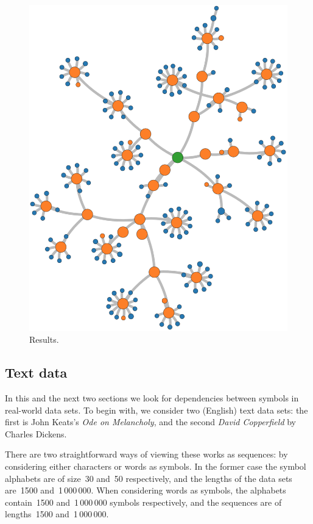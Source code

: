 \documentclass[12pt,a4paper]{article}
\begin{document}
\begin{figure}[htbp]
  \includegraphics[width=\textwidth]{figures/synthetic 3}
\caption{Results.}
\label{fig:25-character model 2}
\end{figure}

\subsection{Text data}\label{sec:text} %

In this and the next two sections we look for dependencies between symbols in
real-world data sets. To begin with, we consider two (English) text data sets:
the first is John Keats's \textit{Ode on Melancholy}, and the second
\textit{David Copperfield} by Charles Dickens.

There are two straightforward ways of viewing these works as sequences: by
considering either characters or words as symbols. In the former case the symbol
alphabets are of size~30 and~50 respectively, and the lengths of the data sets
are~1500 and~1\,000\,000. When considering words as symbols, the alphabets
contain~1500 and~1\,000\,000 symbols respectively, and the sequences are of
lengths~1500 and~1\,000\,000.
\end{document}
